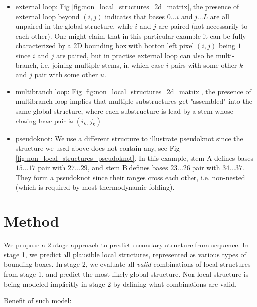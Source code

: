 \documentclass[12pt]{article}
\begin{document}
\begin{itemize}
    \item external loop: Fig \ref{fig:non_local_structures_2d_matrix},
    the presence of external loop beyond $(i, j)$ indicates that
    bases $0 \dots i$ and $j \dots L$ are all unpaired in the global structure,
    while $i$ and $j$ are paired (not necessarily to each other).
    One might claim that in this particular example it can be fully characterized by a 2D bounding box
    with botton left pixel $(i, j)$ being $1$ since $i$ and $j$ are paired,
    but in practise external loop can also be multi-branch,
    i.e. joining multiple stems, in which case $i$ pairs with some other $k$ and $j$ pair with some other $u$.

    \item multibranch loop: Fig \ref{fig:non_local_structures_2d_matrix},
    the presence of multibranch loop implies that multiple substructures get
    "assembled" into the same global structure, where each substructure is lead
    by a stem whose closing base pair is $(i_k, j_k)$.

    \item pseudoknot: We use a different structure to illustrate pseudoknot
    since the structure we used above does not contain any, see Fig \ref{fig:non_local_structures_pseudoknot}.
    In this example, stem A defines bases $15 \dots 17$ pair with $27 \dots 29$,
    and stem B defines bases $23 \dots 26$ pair with $34 \dots 37$.
    They form a pseudoknot since their ranges cross each other, i.e. non-nested (which is required by most thermodynamic folding).


\end{itemize}



\section{Method}

We propose a 2-stage approach to predict secondary structure from sequence.
In stage 1, we predict all plausible local structures, represented as various types of bounding boxes.
In stage 2, we evaluate all \textit{valid} combinations of local structures from stage 1,
and predict the most likely global structure.
Non-local structure is being modeled implicitly in stage 2 by defining what combinations are valid.

Benefit of such model:
\end{document}
